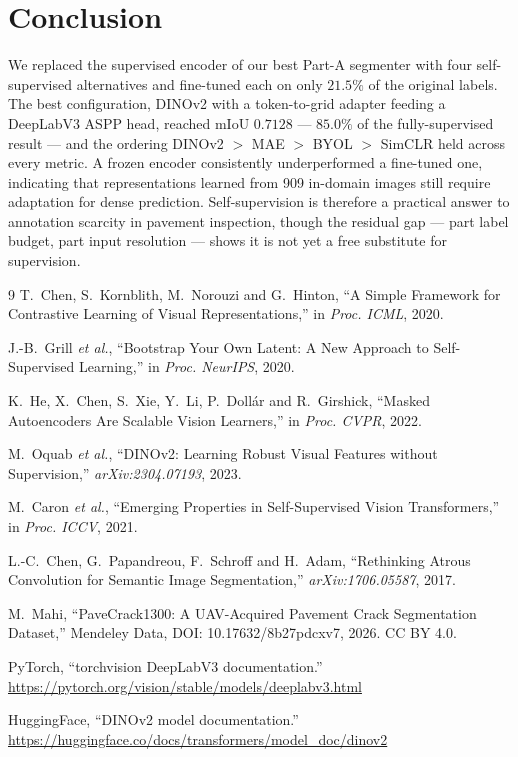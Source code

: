 \documentclass[conference]{IEEEtran}
\begin{document}
\section{Conclusion}

We replaced the supervised encoder of our best Part-A segmenter with four
self-supervised alternatives and fine-tuned each on only $21.5\%$ of the original
labels. The best configuration, DINOv2 with a token-to-grid adapter feeding a
DeepLabV3 ASPP head, reached mIoU $0.7128$ --- $85.0\%$ of the fully-supervised
result --- and the ordering DINOv2 $>$ MAE $>$ BYOL $>$ SimCLR held across every
metric. A frozen encoder consistently underperformed a fine-tuned one, indicating
that representations learned from 909 in-domain images still require adaptation for
dense prediction. Self-supervision is therefore a practical answer to annotation
scarcity in pavement inspection, though the residual gap --- part label budget, part
input resolution --- shows it is not yet a free substitute for supervision.

\begin{thebibliography}{9}
 T.~Chen, S.~Kornblith, M.~Norouzi and G.~Hinton,
``A Simple Framework for Contrastive Learning of Visual Representations,''
in \emph{Proc. ICML}, 2020.

 J.-B.~Grill \emph{et al.},
``Bootstrap Your Own Latent: A New Approach to Self-Supervised Learning,''
in \emph{Proc. NeurIPS}, 2020.

 K.~He, X.~Chen, S.~Xie, Y.~Li, P.~Doll\'ar and R.~Girshick,
``Masked Autoencoders Are Scalable Vision Learners,''
in \emph{Proc. CVPR}, 2022.

 M.~Oquab \emph{et al.},
``DINOv2: Learning Robust Visual Features without Supervision,''
\emph{arXiv:2304.07193}, 2023.

 M.~Caron \emph{et al.},
``Emerging Properties in Self-Supervised Vision Transformers,''
in \emph{Proc. ICCV}, 2021.

 L.-C.~Chen, G.~Papandreou, F.~Schroff and H.~Adam,
``Rethinking Atrous Convolution for Semantic Image Segmentation,''
\emph{arXiv:1706.05587}, 2017.

 M.~Mahi, ``PaveCrack1300: A UAV-Acquired Pavement Crack
Segmentation Dataset,'' Mendeley Data, DOI: 10.17632/8b27pdcxv7, 2026. CC BY 4.0.

 PyTorch, ``torchvision DeepLabV3 documentation.''
\url{https://pytorch.org/vision/stable/models/deeplabv3.html}

 HuggingFace, ``DINOv2 model documentation.''
\url{https://huggingface.co/docs/transformers/model_doc/dinov2}
\end{thebibliography}
\end{document}
